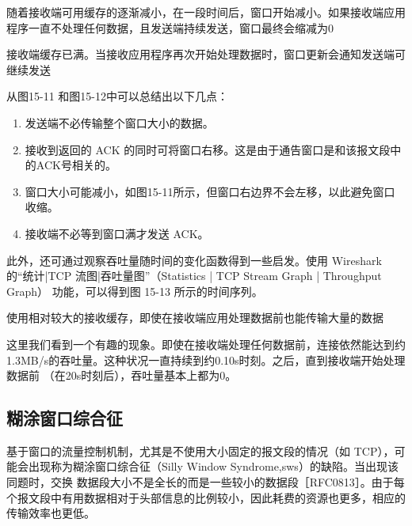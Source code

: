 随着接收端可用缓存的逐渐减小，在一段时间后，窗口开始减小。如果接收端应用程序一直不处理任何数据，且发送端持续发送，窗口最终会缩减为0

接收端缓存已满。当接收应用程序再次开始处理数据时，窗口更新会通知发送端可继续发送

从图15-11 和图15-12中可以总结出以下几点：
\begin{enumerate}
    \item 发送端不必传输整个窗口大小的数据。
    \item 接收到返回的 ACK 的同时可将窗口右移。这是由于通告窗口是和该报文段中的ACK号相关的。
    \item 窗口大小可能减小，如图15-11所示，但窗口右边界不会左移，以此避免窗口收缩。
    \item 接收端不必等到窗口满才发送 ACK。
\end{enumerate}

此外，还可通过观察吞吐量随时间的变化函数得到一些启发。使用 Wireshark的“统计|TCP 流图|吞吐量图”（Statistics | TCP Stream Graph | Throughput Graph） 功能，可以得到图
15-13 所示的时间序列。

使用相对较大的接收缓存，即使在接收端应用处理数据前也能传输大量的数据

这里我们看到一个有趣的现象。即使在接收端处理任何数据前，连接依然能达到约1.3MB/s的吞吐量。这种状况一直持续到约0.10s时刻。之后，直到接收端开始处理数据前
（在20s时刻后），吞吐量基本上都为0。

\subsection{糊涂窗口综合征}
基于窗口的流量控制机制，尤其是不使用大小固定的报文段的情况（如 TCP），可能会出现称为糊涂窗口综合征（Silly Window Syndrome,sws）的缺陷。当出现该同题时，交换
数据段大小不是全长的而是一些较小的数据段［RFC0813］。由于每个报文段中有用数据相对于头部信息的比例较小，因此耗费的资源也更多，相应的传输效率也更低。

